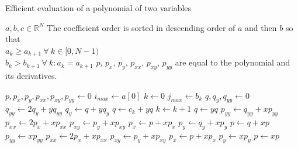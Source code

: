 \documentclass[letterpaper,11pt]{article}
\begin{document}
\begin{algorithm}
\caption{Efficient evaluation of a polynomial of two variables}\label{alg:poly2}
\begin{algorithmic}[1]
\REQUIRE $a,b,c \in \mathbb{R}^N$
\REQUIRE The coefficient order is sorted in descending order of $a$ and then $b$ so that\\
$a_k \ge a_{k+1}\ \forall\ k \in [0,N-1)$\\
$b_k > b_{k+1}\ \forall\ k : a_k = a_{k+1}$
\ENSURE $p$, $p_x$, $p_y$, $p_{xx}$, $p_{xy}$, $p_{yy}$ are equal to the polynomial and its derivatives.

\STATE $p, p_x, p_y, p_{xx}, p_{xy}, p_{yy} \leftarrow 0$
\STATE $i_{max} \leftarrow a[0]$
\STATE $k \leftarrow 0$
        \STATE $j_{max} \leftarrow b_k$
        \STATE $q,q_y,q_{yy} \leftarrow 0$
            \STATE $q_{yy} \leftarrow 2 q_y + y q_{yy}$
            \STATE $q_y \leftarrow q + y q_y$
                \STATE $q \leftarrow c_k + y q$
                \STATE $k \leftarrow k+1$
            \ELSE
                \STATE $q \leftarrow y q$
            \ENDIF
        \ENDFOR
        \STATE $p_{yy} \leftarrow q_{yy} + x p_{yy}$
        \STATE $p_{xx} \leftarrow 2 p_x + x p_{xx}$
        \STATE $p_{xy} \leftarrow p_y + x p_{xy}$
        \STATE $p_x \leftarrow p + x p_x$
        \STATE $p_y \leftarrow q_y + x p_y$
        \STATE $p \leftarrow q + x p$
    \ELSE
        \STATE $p_{yy} \leftarrow x p_{yy}$
        \STATE $p_{xx} \leftarrow 2 p_x + x p_{xx}$
        \STATE $p_{xy} \leftarrow p_y + x p_{xy}$
        \STATE $p_x \leftarrow p + x p_x$
        \STATE $p_y \leftarrow x p_y$
        \STATE $p \leftarrow x p$
    \ENDIF
\ENDFOR
\end{algorithmic}
\end{algorithm}
\end{document}
